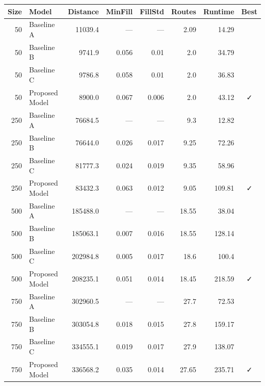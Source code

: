 \begin{tabular}{rlrrrrrc}
\toprule
Size & Model & Distance & MinFill & FillStd & Routes & Runtime & Best \\
\midrule
50 & Baseline A & 11039.4 & — & — & 2.09 & 14.29 &  \\
50 & Baseline B & 9741.9 & 0.056 & 0.01 & 2.0 & 34.79 &  \\
50 & Baseline C & 9786.8 & 0.058 & 0.01 & 2.0 & 36.83 &  \\
50 & Proposed Model & 8900.0 & 0.067 & 0.006 & 2.0 & 43.12 & ✓ \\
250 & Baseline A & 76684.5 & — & — & 9.3 & 12.82 &  \\
250 & Baseline B & 76644.0 & 0.026 & 0.017 & 9.25 & 72.26 &  \\
250 & Baseline C & 81777.3 & 0.024 & 0.019 & 9.35 & 58.96 &  \\
250 & Proposed Model & 83432.3 & 0.063 & 0.012 & 9.05 & 109.81 & ✓ \\
500 & Baseline A & 185488.0 & — & — & 18.55 & 38.04 &  \\
500 & Baseline B & 185063.1 & 0.007 & 0.016 & 18.55 & 128.14 &  \\
500 & Baseline C & 202984.8 & 0.005 & 0.017 & 18.6 & 100.4 &  \\
500 & Proposed Model & 208235.1 & 0.051 & 0.014 & 18.45 & 218.59 & ✓ \\
750 & Baseline A & 302960.5 & — & — & 27.7 & 72.53 &  \\
750 & Baseline B & 303054.8 & 0.018 & 0.015 & 27.8 & 159.17 &  \\
750 & Baseline C & 334555.1 & 0.019 & 0.017 & 27.9 & 138.07 &  \\
750 & Proposed Model & 336568.2 & 0.035 & 0.014 & 27.65 & 235.71 & ✓ \\
\bottomrule
\end{tabular}
